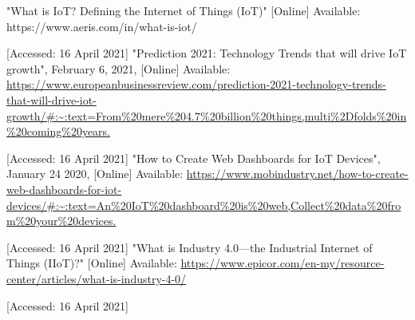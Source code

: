 \documentclass[conference]{IEEEtran}
\begin{document}
\begin{thebibliography}{00}
 "What is IoT? Defining the Internet of Things (IoT)" [Online] Available: https://www.aeris.com/in/what-is-iot/

[Accessed: 16 April 2021]
 "Prediction 2021: Technology Trends that will drive IoT growth", February 6, 2021, [Online] Available: \url{https://www.europeanbusinessreview.com/prediction-2021-technology-trends-that-will-drive-iot-growth/#:~:text=From%20mere%204.7%20billion%20things,multi%2Dfolds%20in%20coming%20years.}

[Accessed: 16 April 2021]
 "How to Create Web Dashboards for IoT Devices", January 24 2020, [Online] Available: \url{https://www.mobindustry.net/how-to-create-web-dashboards-for-iot-devices/#:~:text=An%20IoT%20dashboard%20is%20web,Collect%20data%20from%20your%20devices.}

[Accessed: 16 April 2021]
 "What is Industry 4.0—the Industrial Internet of Things (IIoT)?" [Online] Available: \url{https://www.epicor.com/en-my/resource-center/articles/what-is-industry-4-0/}

[Accessed: 16 April 2021]
\end{thebibliography}
\vspace{12pt}
\end{document}
